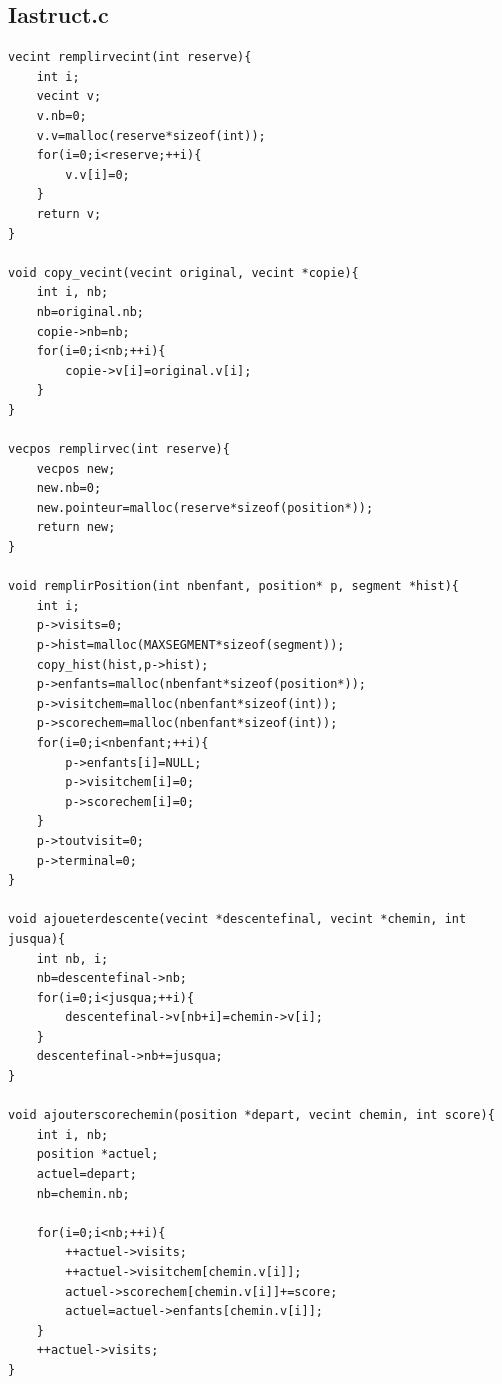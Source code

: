 \documentclass[11pt]{article}
\begin{document}
\subsection{Iastruct.c}
\begin{verbatim}
vecint remplirvecint(int reserve){
	int i;
	vecint v;
	v.nb=0;
	v.v=malloc(reserve*sizeof(int));
	for(i=0;i<reserve;++i){
		v.v[i]=0;
	}
	return v;
}

void copy_vecint(vecint original, vecint *copie){
	int i, nb;
	nb=original.nb;
	copie->nb=nb;
	for(i=0;i<nb;++i){
		copie->v[i]=original.v[i];
	}
}

vecpos remplirvec(int reserve){
	vecpos new;
	new.nb=0;
	new.pointeur=malloc(reserve*sizeof(position*));
	return new;
}

void remplirPosition(int nbenfant, position* p, segment *hist){
	int i;
	p->visits=0;
	p->hist=malloc(MAXSEGMENT*sizeof(segment));
	copy_hist(hist,p->hist);
	p->enfants=malloc(nbenfant*sizeof(position*));
	p->visitchem=malloc(nbenfant*sizeof(int));
	p->scorechem=malloc(nbenfant*sizeof(int));
	for(i=0;i<nbenfant;++i){
		p->enfants[i]=NULL;
		p->visitchem[i]=0;
		p->scorechem[i]=0;
	}
	p->toutvisit=0;
	p->terminal=0;
}

void ajoueterdescente(vecint *descentefinal, vecint *chemin, int jusqua){
	int nb, i;
	nb=descentefinal->nb;
	for(i=0;i<jusqua;++i){
		descentefinal->v[nb+i]=chemin->v[i];
	}
	descentefinal->nb+=jusqua;
}

void ajouterscorechemin(position *depart, vecint chemin, int score){
	int i, nb;
	position *actuel;
	actuel=depart;
	nb=chemin.nb;

	for(i=0;i<nb;++i){
		++actuel->visits;
		++actuel->visitchem[chemin.v[i]];
		actuel->scorechem[chemin.v[i]]+=score;
		actuel=actuel->enfants[chemin.v[i]];
	}
	++actuel->visits;
}

\end{verbatim}
\end{document}
